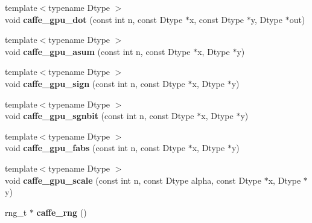 \begin{DoxyCompactItemize}
\item 
{\footnotesize template$<$typename Dtype $>$ }\\void {\bfseries caffe\+\_\+gpu\+\_\+dot} (const int n, const Dtype $\ast$x, const Dtype $\ast$y, Dtype $\ast$out)\hypertarget{namespacecaffe_a27b8cdab6780c4cb54999ef704c775c7}{}\label{namespacecaffe_a27b8cdab6780c4cb54999ef704c775c7}

\item 
{\footnotesize template$<$typename Dtype $>$ }\\void {\bfseries caffe\+\_\+gpu\+\_\+asum} (const int n, const Dtype $\ast$x, Dtype $\ast$y)\hypertarget{namespacecaffe_a20c5fbba1a00759cb2952ba7d20038b2}{}\label{namespacecaffe_a20c5fbba1a00759cb2952ba7d20038b2}

\item 
{\footnotesize template$<$typename Dtype $>$ }\\void {\bfseries caffe\+\_\+gpu\+\_\+sign} (const int n, const Dtype $\ast$x, Dtype $\ast$y)\hypertarget{namespacecaffe_a76546f7548a863bc25b9e94b8ac9c29a}{}\label{namespacecaffe_a76546f7548a863bc25b9e94b8ac9c29a}

\item 
{\footnotesize template$<$typename Dtype $>$ }\\void {\bfseries caffe\+\_\+gpu\+\_\+sgnbit} (const int n, const Dtype $\ast$x, Dtype $\ast$y)\hypertarget{namespacecaffe_ad904a7b77a6c4e1965fb7916c017e82a}{}\label{namespacecaffe_ad904a7b77a6c4e1965fb7916c017e82a}

\item 
{\footnotesize template$<$typename Dtype $>$ }\\void {\bfseries caffe\+\_\+gpu\+\_\+fabs} (const int n, const Dtype $\ast$x, Dtype $\ast$y)\hypertarget{namespacecaffe_a74fccafb8af6d9d75bbbdb8ed6e2d762}{}\label{namespacecaffe_a74fccafb8af6d9d75bbbdb8ed6e2d762}

\item 
{\footnotesize template$<$typename Dtype $>$ }\\void {\bfseries caffe\+\_\+gpu\+\_\+scale} (const int n, const Dtype alpha, const Dtype $\ast$x, Dtype $\ast$y)\hypertarget{namespacecaffe_abee4ef6a15c5bd2e1d9900ddb69c37f4}{}\label{namespacecaffe_abee4ef6a15c5bd2e1d9900ddb69c37f4}

\item 
rng\+\_\+t $\ast$ {\bfseries caffe\+\_\+rng} ()\hypertarget{namespacecaffe_ad73507e5bac89c93ea8e5d317aafe49f}{}\label{namespacecaffe_ad73507e5bac89c93ea8e5d317aafe49f}


\end{DoxyCompactItemize}
